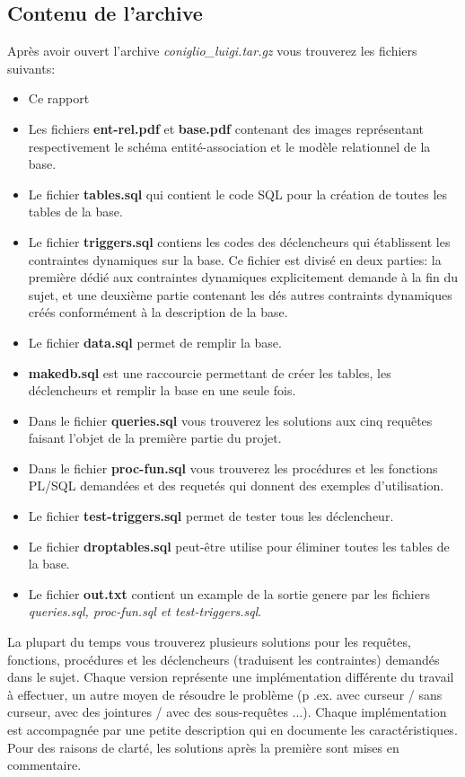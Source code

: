 \documentclass[twoside,openright,a4paper,11pt,french]{article}
\begin{document}
\subsection{Contenu de l'archive}
Après avoir ouvert l'archive {\it coniglio\_luigi.tar.gz} vous
trouverez les fichiers suivants:
\smallbreak
\begin{itemize}
\item Ce rapport
\item Les fichiers {\bf ent-rel.pdf} et {\bf base.pdf} contenant des images
      représentant respectivement le schéma entité-association et le modèle
      relationnel de la base.
\item Le fichier {\bf tables.sql} qui contient le code SQL pour la création 
      de toutes les tables de la base.
\item Le fichier {\bf triggers.sql} contiens les codes des déclencheurs qui
      établissent les contraintes dynamiques sur la base. Ce fichier est divisé en
      deux parties: la première dédié aux contraintes dynamiques explicitement
      demande à la fin du sujet, et une deuxième partie contenant les dés autres
      contraints dynamiques créés conformément à la description de la base.
\item Le fichier {\bf data.sql} permet de remplir la base.
\item {\bf makedb.sql} est une raccourcie permettant de créer les tables, les 
      déclencheurs et remplir la base en une seule fois.
\item Dans le fichier {\bf queries.sql} vous trouverez les solutions aux 
      cinq requêtes faisant l'objet de la première partie du projet.
\item Dans le fichier {\bf proc-fun.sql} vous trouverez les procédures et 
      les fonctions PL/SQL demandées et des requetés qui donnent des exemples d'utilisation.
\item Le fichier {\bf test-triggers.sql} permet de tester tous les déclencheur.
\item Le fichier {\bf droptables.sql} peut-être utilise pour éliminer toutes 
      les tables de la base.
\item Le fichier {\bf out.txt} contient un example de la sortie genere par 
      les fichiers {\it queries.sql, proc-fun.sql et test-triggers.sql}. 
\end{itemize}

\bigbreak
La plupart du temps vous trouverez plusieurs solutions pour les requêtes,
fonctions, procédures et les déclencheurs (traduisent les contraintes) demandés
dans le sujet. Chaque version représente une implémentation différente du
travail à effectuer, un autre moyen de résoudre le problème (p .ex. avec
curseur / sans curseur, avec des jointures / avec des sous-requêtes ...).
Chaque implémentation est accompagnée par une petite description qui en
documente les caractéristiques. Pour des raisons de clarté, les solutions après
la première sont mises en commentaire.
\end{document}
